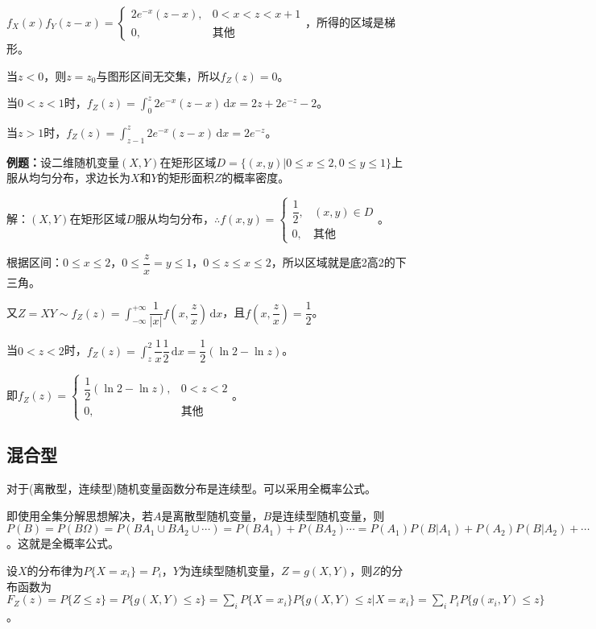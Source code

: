 \documentclass[UTF8, 12pt]{ctexart}
\begin{document}
$f_X(x)f_Y(z-x)=\left\{\begin{array}{ll}
    2e^{-x}(z-x), & 0<x<z<x+1 \\
    0, & \text{其他}
\end{array}\right.$，所得的区域是梯形。

当$z<0$，则$z=z_0$与图形区间无交集，所以$f_Z(z)=0$。

当$0<z<1$时，$f_Z(z)=\int_0^z2e^{-x}(z-x)\,\textrm{d}x=2z+2e^{-z}-2$。

当$z>1$时，$f_Z(z)=\int_{z-1}^z2e^{-x}(z-x)\,\textrm{d}x=2e^{-z}$。

\textbf{例题：}设二维随机变量$(X,Y)$在矩形区域$D=\{(x,y)|0\leqslant x\leqslant 2,0\leqslant y\leqslant 1\}$上服从均匀分布，求边长为$X$和$Y$的矩形面积$Z$的概率密度。

解：$(X,Y)$在矩形区域$D$服从均匀分布，$\therefore f(x,y)=\left\{\begin{array}{ll}
    \dfrac{1}{2}, & (x,y)\in D \\
    0, & \text{其他}
\end{array}\right.$。

根据区间：$0\leqslant x\leqslant2$，$0\leqslant\dfrac{z}{x}=y\leqslant1$，$0\leqslant z\leqslant x\leqslant2$，所以区域就是底2高2的下三角。

又$Z=XY\sim f_Z(z)=\displaystyle{\int_{-\infty}^{+\infty}\dfrac{1}{\vert x\vert}f\left(x,\dfrac{z}{x}\right)\,\textrm{d}x}$，且$f\left(x,\dfrac{z}{x}\right)=\dfrac{1}{2}$。

当$0<z<2$时，$f_Z(z)=\displaystyle{\int_z^2}\dfrac{1}{x}\dfrac{1}{2}\,\textrm{d}x=\dfrac{1}{2}(\ln2-\ln z)$。

即$f_Z(z)=\left\{\begin{array}{ll}
    \dfrac{1}{2}(\ln2-\ln z), & 0<z<2 \\
    0, & \text{其他}
\end{array}\right.$。

\subsection{混合型}
 
对于(离散型，连续型)随机变量函数分布是连续型。可以采用全概率公式。

即使用全集分解思想解决，若$A$是离散型随机变量，$B$是连续型随机变量，则$P(B)=P(B\Omega)=P(BA_1\cup BA_2\cup\cdots)=P(BA_1)+P(BA_2)\cdots=P(A_1)P(B|A_1)+P(A_2)P(B|A_2)+\cdots$。这就是全概率公式。

设$X$的分布律为$P\{X=x_i\}=P_i$，$Y$为连续型随机变量，$Z=g(X,Y)$，则$Z$的分布函数为$F_Z(z)=P\{Z\leqslant z\}=P\{g(X,Y)\leqslant z\}=\sum\limits_iP\{X=x_i\}P\{g(X,Y)\leqslant z|X=x_i\}=\sum\limits_iP_iP\{g(x_i,Y)\leqslant z\}$。
\end{document}
